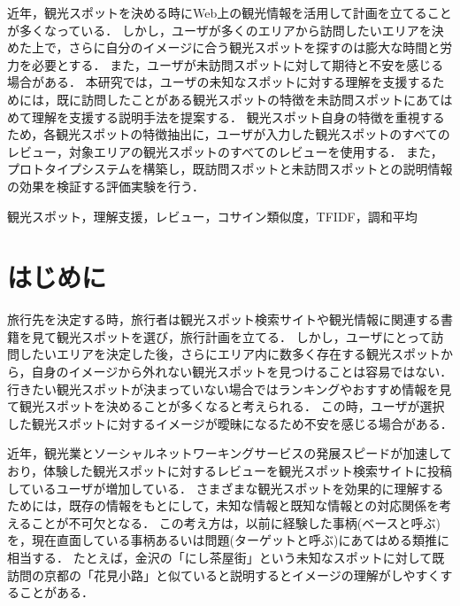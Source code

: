 \documentclass{deimj}
\begin{document}
\pagestyle{empty}
\begin{jabstract}
近年，観光スポットを決める時にWeb上の観光情報を活用して計画を立てることが多くなっている．
しかし，ユーザが多くのエリアから訪問したいエリアを決めた上で，さらに自分のイメージに合う観光スポットを探すのは膨大な時間と労力を必要とする．
また，ユーザが未訪問スポットに対して期待と不安を感じる場合がある．
本研究では，ユーザの未知なスポットに対する理解を支援するためには，既に訪問したことがある観光スポットの特徴を未訪問スポットにあてはめて理解を支援する説明手法を提案する．
観光スポット自身の特徴を重視するため，各観光スポットの特徴抽出に，ユーザが入力した観光スポットのすべてのレビュー，対象エリアの観光スポットのすべてのレビューを使用する．
また，プロトタイプシステムを構築し，既訪問スポットと未訪問スポットとの説明情報の効果を検証する評価実験を行う．
\end{jabstract}

\begin{jkeyword}
観光スポット，理解支援，レビュー，コサイン類似度，TFIDF，調和平均
\end{jkeyword}
\maketitle


\section{はじめに}
\label{sec:Introduction}
旅行先を決定する時，旅行者は観光スポット検索サイトや観光情報に関連する書籍を見て観光スポットを選び，旅行計画を立てる．
しかし，ユーザにとって訪問したいエリアを決定した後，さらにエリア内に数多く存在する観光スポットから，自身のイメージから外れない観光スポットを見つけることは容易ではない．
行きたい観光スポットが決まっていない場合ではランキングやおすすめ情報を見て観光スポットを決めることが多くなると考えられる．
この時，ユーザが選択した観光スポットに対するイメージが曖昧になるため不安を感じる場合がある．

近年，観光業とソーシャルネットワーキングサービスの発展スピードが加速しており，体験した観光スポットに対するレビューを観光スポット検索サイトに投稿しているユーザが増加している．
さまざまな観光スポットを効果的に理解するためには，既存の情報をもとにして，未知な情報と既知な情報との対応関係を考えることが不可欠となる．
この考え方は，以前に経験した事柄(ベースと呼ぶ)を，現在直面している事柄あるいは問題(ターゲットと呼ぶ)にあてはめる類推に相当する．
たとえば，金沢の「にし茶屋街」という未知なスポットに対して既訪問の京都の「花見小路」と似ていると説明するとイメージの理解がしやすくすることがある．
\end{document}
